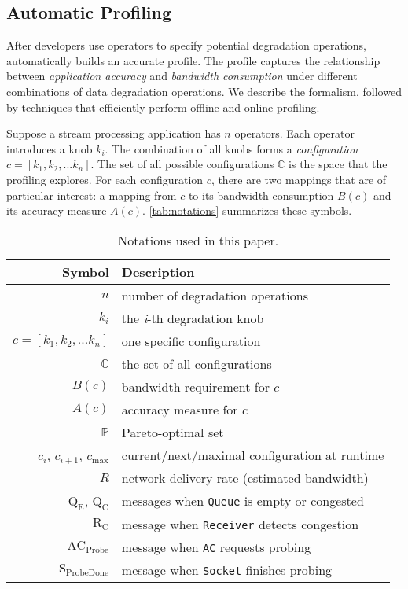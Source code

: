 \subsection{Automatic Profiling}
\label{sec:automatic-profiling}

After developers use \maybe{} operators to specify potential degradation
operations, \sysname{} automatically builds an accurate profile. The profile
captures the relationship between \textit{application accuracy} and
\textit{bandwidth consumption} under different combinations of data degradation
operations. We describe the formalism, followed by techniques that efficiently
perform offline and online profiling.

 Suppose a stream processing application has $n$
\maybe{} operators. Each operator introduces a knob $k_i$. The combination of
all knobs forms a \textit{configuration} $c = [k_{1}, k_{2}, ... k_{n}]$. The
set of all possible configurations $\mathbb{C}$ is the space that the profiling
explores. For each configuration $c$, there are two mappings that are of
particular interest: a mapping from $c$ to its bandwidth consumption $B(c)$ and
its accuracy measure $A(c)$. \autoref{tab:notations} summarizes these symbols.


\begin{table}
  \footnotesize
  \centering
  \begin{tabular}{r l}
    \toprule
    \textbf{Symbol} & \textbf{Description} \\
    \midrule
    $n$ & number of degradation operations \\
    $k_i$ & the \textit{i}-th degradation knob \\
    $c = [k_{1}, k_{2}, ... k_{n}]$ & one specific configuration \\
    $\mathbb{C}$ & the set of all configurations \\
    \midrule
    $B(c)$ & bandwidth requirement for $c$ \\
    $A(c)$ & accuracy measure for $c$ \\
    $\mathbb{P}$ & Pareto-optimal set \\
    \midrule
    $c_i$, $c_{i+1}$, $c_{\max}$ & current/next/maximal configuration at runtime \\
    $R$ & network delivery rate (estimated bandwidth) \\
    $\text{Q}_\text{E}$, $\text{Q}_\text{C}$ & messages when \texttt{Queue} is empty or congested \\
    $\text{R}_\text{C}$ & message when \texttt{Receiver} detects congestion \\
    $\text{AC}_\text{Probe}$ & message when \texttt{AC} requests probing \\
    $\text{S}_\text{ProbeDone}$ & message when \texttt{Socket} finishes probing \\
    \bottomrule
  \end{tabular}
  \vspace{0.3em}
  \caption{Notations used in this paper.}
  \label{tab:notations}
  \vspace{-1.5em}
\end{table}

